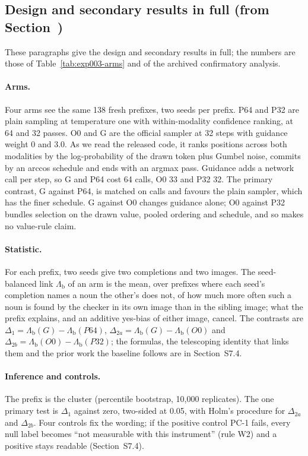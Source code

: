 \documentclass[acmsmall,screen]{acmart}
\makeatletter
\newcommand{\Mref}[1]{\@ifundefined{mr@#1}{\textbf{??}}{\csname mr@#1\endcsname}}
\makeatother
\begin{document}
\subsection{Design and secondary results in full (from Section~\Mref{sec:exp003})}
\label{sec:s-exp003-full}
These paragraphs give the design and secondary results in full; the numbers are those of Table~\ref{tab:exp003-arms} and of the archived confirmatory analysis.

\paragraph{Arms.}
Four arms see the same 138 fresh prefixes, two seeds per prefix. P64 and P32 are plain sampling at temperature one with within-modality confidence ranking, at 64 and 32 passes. O0 and G are the official sampler at 32 steps with guidance weight 0 and 3.0. As we read the released code, it ranks positions across both modalities by the log-probability of the drawn token plus Gumbel noise, commits by an arccos schedule and ends with an argmax pass. Guidance adds a network call per step, so G and P64 cost 64 calls, O0 33 and P32 32. The primary contrast, G against P64, is matched on calls and favours the plain sampler, which has the finer schedule. G against O0 changes guidance alone; O0 against P32 bundles selection on the drawn value, pooled ordering and schedule, and so makes no value-rule claim. %

\paragraph{Statistic.}
For each prefix, two seeds give two completions and two images. The seed-balanced link $\Lambda_{\mathrm b}$ of an arm is the mean, over prefixes where each seed's completion names a noun the other's does not, of how much more often such a noun is found by the checker in its own image than in the sibling image; what the prefix explains, and an additive yes-bias of either image, cancel. The contrasts are $\Delta_1=\Lambda_{\mathrm b}(G)-\Lambda_{\mathrm b}(P64)$, $\Delta_{2a}=\Lambda_{\mathrm b}(G)-\Lambda_{\mathrm b}(O0)$ and $\Delta_{2b}=\Lambda_{\mathrm b}(O0)-\Lambda_{\mathrm b}(P32)$; the formulas, the telescoping identity that links them and the prior work the baseline follows are in Section~S7.4. %

\paragraph{Inference and controls.}
The prefix is the cluster (percentile bootstrap, 10,000 replicates). The one primary test is $\Delta_1$ against zero, two-sided at 0.05, with Holm's procedure for $\Delta_{2a}$ and $\Delta_{2b}$. Four controls fix the wording; if the positive control PC-1 fails, every null label becomes ``not measurable with this instrument'' (rule W2) and a positive stays readable (Section~S7.4). %
\end{document}
